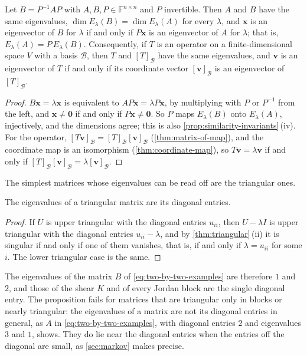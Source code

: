 \begin{proposition}
\label{prop:similar-eigen}
Let $B=P^{-1}AP$ with $A,B,P\in\mathbb F^{n\times n}$ and $P$ invertible. Then $A$ and $B$ have the same eigenvalues, $\dim E_\lambda(B)=\dim E_\lambda(A)$ for every $\lambda$, and $\mathbf x$ is an eigenvector of $B$ for $\lambda$ if and only if $P\mathbf x$ is an eigenvector of $A$ for $\lambda$; that is, $E_\lambda(A)=P\,E_\lambda(B)$. Consequently, if $T$ is an operator on a finite-dimensional space $V$ with a basis $\mathcal B$, then $T$ and $[T]_{\mathcal B}$ have the same eigenvalues, and $\mathbf v$ is an eigenvector of $T$ if and only if its coordinate vector $[\mathbf v]_{\mathcal B}$ is an eigenvector of $[T]_{\mathcal B}$.
\end{proposition}

\begin{proof}
$B\mathbf x=\lambda\mathbf x$ is equivalent to $AP\mathbf x=\lambda P\mathbf x$, by multiplying with $P$ or $P^{-1}$ from the left, and $\mathbf x\ne\mathbf 0$ if and only if $P\mathbf x\ne\mathbf 0$. So $P$ maps $E_\lambda(B)$ onto $E_\lambda(A)$, injectively, and the dimensions agree; this is also \cref{prop:similarity-invariants}\,(iv). For the operator, $[T\mathbf v]_{\mathcal B}=[T]_{\mathcal B}[\mathbf v]_{\mathcal B}$ (\cref{thm:matrix-of-map}), and the coordinate map is an isomorphism (\cref{thm:coordinate-map}), so $T\mathbf v=\lambda\mathbf v$ if and only if $[T]_{\mathcal B}[\mathbf v]_{\mathcal B}=\lambda[\mathbf v]_{\mathcal B}$.
\end{proof}

The simplest matrices whose eigenvalues can be read off are the triangular ones.

\begin{proposition}
\label{prop:triangular-eigen}
The eigenvalues of a triangular matrix are its diagonal entries.
\end{proposition}

\begin{proof}
If $U$ is upper triangular with the diagonal entries $u_{ii}$, then $U-\lambda I$ is upper triangular with the diagonal entries $u_{ii}-\lambda$, and by \cref{thm:triangular}\,(ii) it is singular if and only if one of them vanishes, that is, if and only if $\lambda=u_{ii}$ for some $i$. The lower triangular case is the same.
\end{proof}

The eigenvalues of the matrix $B$ of \eqref{eq:two-by-two-examples} are therefore $1$ and $2$, and those of the shear $K$ and of every Jordan block are the single diagonal entry. The proposition fails for matrices that are triangular only in blocks or nearly triangular: the eigenvalues of a matrix are not its diagonal entries in general, as $A$ in \eqref{eq:two-by-two-examples}, with diagonal entries $2$ and eigenvalues $3$ and $1$, shows. They do lie near the diagonal entries when the entries off the diagonal are small, as \cref{sec:markov} makes precise.


